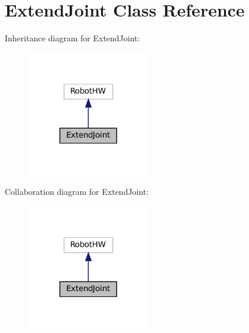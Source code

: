 \hypertarget{classExtendJoint}{}\section{Extend\+Joint Class Reference}
\label{classExtendJoint}


Inheritance diagram for Extend\+Joint\+:
\nopagebreak
\begin{figure}[H]
\begin{center}
\leavevmode
\includegraphics[width=152pt]{classExtendJoint__inherit__graph}
\end{center}
\end{figure}


Collaboration diagram for Extend\+Joint\+:
\nopagebreak
\begin{figure}[H]
\begin{center}
\leavevmode
\includegraphics[width=152pt]{classExtendJoint__coll__graph}
\end{center}
\end{figure}
